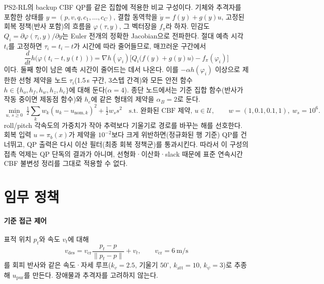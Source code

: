 \documentclass[10pt,a4paper]{article}
\newcommand{\upur}{u_{\mathrm{pur}}}
\begin{document}
PS2-RL의 backup CBF QP를 같은 집합에 적용한 비교 구성이다. 기체와 추격자를 포함한 상태를 $y=(p,v,q,c_1,\dots,c_C)$, 결합 동역학을 $\dot y=f(y)+g(y)u$,
고정된 회복 정책(반사 포함)의 흐름을 $\varphi(\tau,y)$, 그 벡터장을 $f_\pi$라 하자.
민감도 $Q_i=\partial\varphi(\tau_i,y)/\partial y$는 Euler 전개의 정확한 Jacobian으로 전파한다.
절대 예측 시각 $t_i$를 고정하면 $\tau_i=t_i-t$가 시간에 따라 줄어들므로, 매끄러운 구간에서
\begin{equation}
\frac{d}{dt}h\big(\varphi(t_i-t,y(t))\big)=\nabla h(\varphi_i)\big[Q_i\big(f(y)+g(y)u\big)-f_\pi(\varphi_i)\big]
\end{equation}
이다. 둘째 항이 남은 예측 시간이 줄어드는 데서 나온다. 이를 $-\alpha h(\varphi_i)$ 이상으로 제한한 선형 제약을 노드 $\tau_i$(1.5\,s 구간, 3스텝 간격)와 모든 안전 함수 $h\in\{h_o,h_f,h_w,h_z,h_c\}$에 대해 둔다($\alpha=4$).
종단 노드에서는 기준 집합 함수(반사가 작동 중이면 제동점 함수)와 $h_c$에 같은 형태의 제약을 $\alpha_B=2$로 둔다.
\begin{equation}
\min_{u,\ s\ge0}\ \tfrac12\sum_kw_k(u_k-u_{\mathrm{nom},k})^2+\tfrac12w_ss^2\quad\text{s.t. 완화된 CBF 제약, }u\in\mathcal U,\qquad w=(1,0.1,0.1,1),\ w_s=10^6 .
\end{equation}
roll/pitch 각속도의 가중치가 작아 추력보다 기울기로 경로를 바꾸는 해를 선호한다.
회복 입력 $u=\pi_b(x)$가 제약을 $10^{-2}$보다 크게 위반하면(정규화된 행 기준) QP를 건너뛰고, QP 출력은 다시 이산 필터(최종 회복 정책군)를 통과시킨다.
따라서 이 구성의 접촉 억제는 QP 단독의 결과가 아니며, 선형화·이산화·slack 때문에 표준 연속시간 CBF 불변성 정리를 그대로 적용할 수 없다.

\section{임무 정책}\label{sec:striker}

\paragraph{기준 접근 제어} 표적 위치 $p_t$와 속도 $v_t$에 대해
\begin{equation}
v_{\mathrm{des}}=v_{\mathrm{cr}}\frac{p_t-p}{\|p_t-p\|}+v_t,\qquad v_{\mathrm{cr}}=6\ \mathrm{m/s}
\end{equation}
를 회피 반사와 같은 속도·자세 루프($k_v=2.5$, 기울기 $50^\circ$, $k_{\mathrm{att}}=10$, $k_\psi=3$)로 추종해 $\upur$를 만든다. 장애물과 추격자를 고려하지 않는다.
\end{document}

